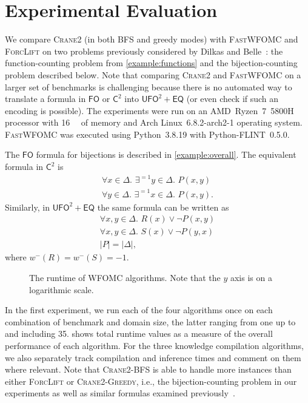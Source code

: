 \documentclass{article}
\theoremstyle{definition}
\theoremstyle{remark}
\newcommand{\Ctwo}{$\mathsf{C}^{2}$}
\newcommand{\FO}{$\mathsf{FO}$}
\newcommand{\UFO}{$\mathsf{UFO}^{2} + \mathsf{EQ}$}
\newcommand{\Cranetwo}{\textsc{Crane2}}
\newcommand{\Cranebfs}{\textsc{Crane2-BFS}}
\newcommand{\Cranegreedy}{\textsc{Crane2-Greedy}}
\begin{document}
\section{Experimental Evaluation}

We compare \Cranetwo{} (in both BFS and greedy modes) with \textsc{FastWFOMC}
and \textsc{ForcLift} on two problems previously considered by Dilkas and
Belle~: the function-counting problem from
\cref{example:functions} and the bijection-counting problem described below.
Note that comparing \Cranetwo{} and \textsc{FastWFOMC} on a larger set of
benchmarks is challenging because there is no automated way to translate a
formula in \FO{} or \Ctwo{} into \UFO{} (or even check if such an encoding is
possible). The experiments were run on an AMD~Ryzen~7~5800H processor with
\SI{16}{\gibi\byte} of memory and Arch Linux~6.8.2-arch2-1 operating system.
\textsc{FastWFOMC} was executed using Python~3.8.19 with Python-FLINT~0.5.0.

The \FO{} formula for bijections is described in \cref{example:overall}. The
equivalent formula in \Ctwo{} is
\begin{gather*}
  \forall x \in \Delta\text{. }\exists^{=1} y \in \Delta\text{. }P(x, y)\\
  \forall y \in \Delta\text{. }\exists^{=1} x \in \Delta\text{. }P(x, y).
\end{gather*}
Similarly, in \UFO{} the same formula can be written as
\begin{gather*}
  \forall x, y \in \Delta\text{. }R(x) \lor \neg P(x, y)\\
  \forall x, y \in \Delta\text{. }S(x) \lor \neg P(y, x)\\
  |P| = |\Delta|,
\end{gather*}
where $w^{-}(R) = w^{-}(S) = -1$.

\begin{figure}
  \centering
  
  \caption{The runtime of WFOMC algorithms. Note that the $y$ axis is on a
    logarithmic scale.}\label{fig:plot}
\end{figure}

In the first experiment, we run each of the four algorithms once on each
combination of benchmark and domain size, the latter ranging from one up to and
including 35.  shows total runtime values as a measure of the
overall performance of each algorithm. For the three knowledge compilation
algorithms, we also separately track compilation and inference times and comment
on them where relevant. Note that \Cranebfs{} is able to handle more instances
than either \textsc{ForcLift} or \Cranegreedy{}, i.e., the bijection-counting
problem in our experiments as well as similar formulas examined
previously~\cite{DBLP:conf/kr/DilkasB23}.
\end{document}
